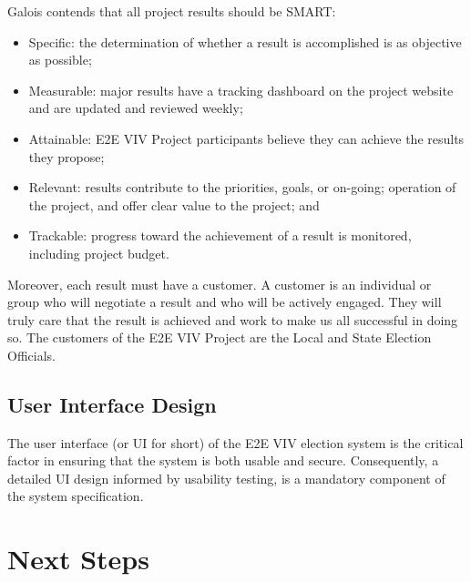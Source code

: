 Galois contends that all project results should be SMART: 
\begin{itemize}
\item Specific: the determination of whether a result is accomplished
  is as objective as possible; 
\item Measurable: major results have a tracking dashboard on the
  project website and are updated and reviewed weekly; 
\item Attainable: E2E VIV Project participants believe they can
  achieve the results they propose; 
\item Relevant: results contribute to the priorities, goals, or
  on-going; operation of the project, and offer clear value to the
  project; and 
\item Trackable: progress toward the achievement of a result is
  monitored, including project budget. 
\end{itemize}

Moreover, each result must have a customer. A customer is an
individual or group who will negotiate a result and who will be
actively engaged. They will truly care that the result is achieved and
work to make us all successful in doing so. The customers of the E2E
VIV Project are the Local and State Election Officials. 

\subsection{User Interface Design}

The user interface (or UI for short) of the E2E VIV election system is
the critical factor in ensuring that the system is both usable and
secure. Consequently, a detailed UI design informed by usability
testing, is a mandatory component of the system specification.


\section{Next Steps}

